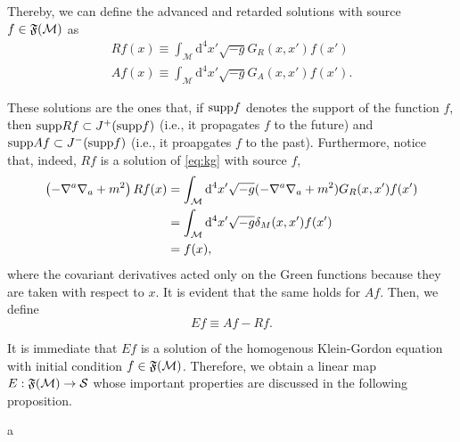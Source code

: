 Thereby, we can define the advanced and retarded solutions with source \(f\in{\mathfrak{F}}({\mathcal{M}})\) as
\begin{subequations}
    \begin{align}
        Rf(x)\equiv\int_\mathcal{M}\mathrm{d}^4x'\sqrt{-g}G_R(x,x')f(x')\\
        Af(x)\equiv\int_\mathcal{M}\mathrm{d}^4x'\sqrt{-g}G_A(x,x')f(x').
    \end{align}
\end{subequations}

These solutions are the ones that, if \(\mathrm{supp}f\) denotes the support of the function \(f\), then \(\mathrm{supp}Rf\subset J^+(\mathrm{supp}f)\) (i.e., it propagates \(f\) to the future) and \(\mathrm{supp}Af\subset J^-(\mathrm{supp}f)\) (i.e., it proapgates \(f\) to the past). Furthermore, notice that, indeed, \(Rf\) is a solution of \cref{eq:kg} with source \(f\),
\begin{subequations}
    \begin{align}
        \left(-\nabla^a\nabla_a+m^2\right)Rf(x)&=\int_\mathcal{M}\mathrm{d}^4x'\sqrt{-g}(-\nabla^a\nabla_a+m^2)G_R(x,x')f(x')\\
        &=\int_{\mathcal{M}}\mathrm{d}^4x'\sqrt{-g}\delta_M(x,x')f(x')\\
        &=f(x),
    \end{align}
\end{subequations}
where the covariant derivatives acted only on the Green functions because they are taken with respect to \(x\). It is evident that the same holds for \(Af\). Then, we define
\begin{equation}
    Ef\equiv Af-Rf.
\end{equation}

It is immediate that \(Ef\) is a solution of the homogenous Klein-Gordon equation with initial condition \(f\in{\mathfrak{F}}({\mathcal{M}})\). Therefore, we obtain a linear map \(E:{\mathfrak{F}}({\mathcal{M}})\to{\mathcal{S}}\) whose important properties are discussed in the following proposition.
\begin{proposition}
    a
\end{proposition}